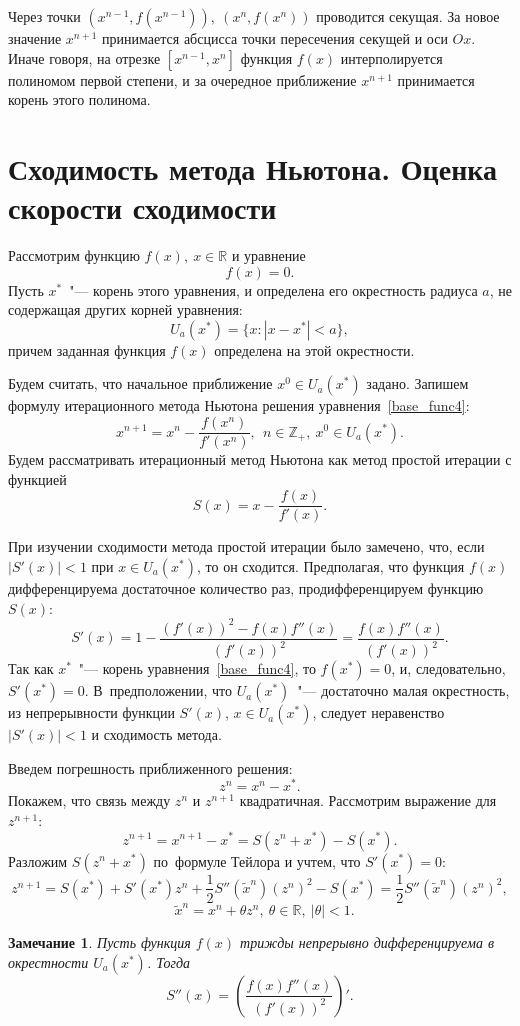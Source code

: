 \documentclass[11pt,a4paper,twoside,listtotoc,bibtotoc]{report}
\numberwithin{equation}{section}
\theoremstyle{definition}
\theoremstyle{plain}
\newtheorem*{note*}{Замечание}
\begin{document}
Через точки $(x^{n-1}, f(x^{n-1})), ~(x^n, f(x^n))$ проводится секущая.
За новое значение $x^{n+1}$ принимается абсцисса точки пересечения секущей
и оси $Ox$. Иначе говоря, на отрезке $[x^{n-1}, x^n]$ функция $f(x)$ интерполируется
полиномом первой степени, и за очередное приближение $x^{n+1}$ принимается
корень этого полинома.
%
\section{Сходимость метода Ньютона. Оценка скорости сходимости}
%
Рассмотрим функцию $f(x), ~x\in \mathbb{R}$ и уравнение
%
\begin{equation}
%
    \label{base_func4}
    f(x)=0.
%
\end{equation}
%
Пусть $x^*$~"--- корень этого уравнения, и определена его
окрестность радиуса $a$, не содержащая других корней уравнения:
%
$$
    U_a(x^*)=\{x:|x-x^*| < a\},
$$
%
причем заданная функция $f(x)$ определена на этой окрестности.

Будем считать, что начальное приближение $x^0 \in U_a(x^*)$ задано.
Запишем формулу итерационного метода Ньютона решения уравнения~\eqref{base_func4}:
%
$$
    x^{n + 1} = x^n - \frac{f(x^n)}{f'(x^n)}, ~~n\in\mathbb{Z_+}, ~x^0 \in U_a(x^*).
$$
%
Будем рассматривать итерационный метод Ньютона как метод простой итерации
с функцией
%
$$
    S(x) = x - \frac{f(x)}{f'(x)}.
$$
%

При изучении сходимости метода простой итерации было замечено, что,
если $|S'(x)| < 1$ при $x \in U_a(x^*)$, то он сходится.
Предполагая, что функция $f(x)$ дифференцируема достаточное количество раз,
продифференцируем функцию $S(x)$:
%
$$
    S'(x) = 1 - \frac{(f'(x))^2 - f(x)f''(x)}{(f'(x))^2} =
    \frac{f(x)f''(x)}{(f'(x))^2}.
$$
%
Так как $x^*$~"--- корень уравнения~\eqref{base_func4}, то $f(x^*)=0$, и,
следовательно, $S'(x^*)=0$. В~предположении, что $U_a(x^*)$~"--- достаточно
малая окрестность, из непрерывности функции $S'(x)$,
$x \in U_a(x^*)$, следует неравенство $\left|S'(x)\right| < 1$ и сходимость метода.

Введем погрешность приближенного решения:
$$
    z^n = x^n - x^*.
$$
Покажем, что связь между $z^n$ и $z^{n+1}$ квадратичная.
Рассмотрим выражение для $z^{n+1}$:
%
\begin{equation}
%
    \label{headache}
    z^{n + 1} = x^{n + 1} - x^* = S(z^n + x^*) - S(x^*).
%
\end{equation}
%
Разложим $S(z^n + x^*)$ по~формуле Тейлора и учтем, что $S'(x^*)=0$:
%
\begin{equation}
%
    \label{terrible_headache}
    z^{n + 1} = S(x^*) + S'(x^*)z^n +
    \frac{1}{2}S''(\tilde{x}^n)\left(z^n\right)^2 - S(x^*) =
    \frac{1}{2}S''(\tilde{x}^n)(z^n)^2,
%
\end{equation}
%
%
$$
    ~~~\tilde{x}^n=x^n+\theta z^n, ~\theta\in\mathbb{R}, ~|\theta|<1.
$$
%
%
\begin{note*}
%
    Пусть функция $f(x)$ трижды непрерывно дифференцируема в окрестности
    $U_a(x^*)$. Тогда
    $$
        S''(x) = \left(\frac{f(x)f''(x)}{(f'(x))^2}\right)'.
    $$
%
\end{note*}
%
\end{document}
